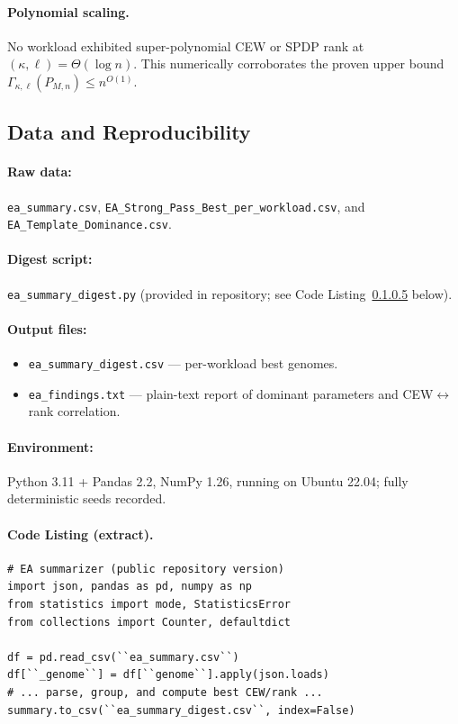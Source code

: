 \documentclass[12pt]{article}
\theoremstyle{definition}
\theoremstyle{definition}
\theoremstyle{remark}
\theoremstyle{remark}
\begin{document}
\paragraph{Polynomial scaling.}
No workload exhibited super-polynomial CEW or SPDP rank at $(\kappa, \ell) = \Theta(\log n)$. This numerically corroborates the proven upper bound $\Gamma_{\kappa,\ell}(P_{M,n}) \leq n^{O(1)}$.

\subsection{Data and Reproducibility}

\paragraph{Raw data:}
\texttt{ea\_summary.csv}, \texttt{EA\_Strong\_Pass\_Best\_per\_workload.csv}, and \texttt{EA\_Template\_Dominance.csv}.

\paragraph{Digest script:}
\texttt{ea\_summary\_digest.py} (provided in repository; see Code Listing~\ref{code:ea-digest} below).

\paragraph{Output files:}
\begin{itemize}
\item \texttt{ea\_summary\_digest.csv} --- per-workload best genomes.
\item \texttt{ea\_findings.txt} --- plain-text report of dominant parameters and CEW$\leftrightarrow$rank correlation.
\end{itemize}

\paragraph{Environment:}
Python 3.11 + Pandas 2.2, NumPy 1.26, running on Ubuntu 22.04; fully deterministic seeds recorded.

\paragraph{Code Listing (extract).}
\label{code:ea-digest}
\begin{verbatim}
# EA summarizer (public repository version)
import json, pandas as pd, numpy as np
from statistics import mode, StatisticsError
from collections import Counter, defaultdict

df = pd.read_csv(``ea_summary.csv``)
df[``_genome``] = df[``genome``].apply(json.loads)
# ... parse, group, and compute best CEW/rank ...
summary.to_csv(``ea_summary_digest.csv``, index=False)
\end{verbatim}
\end{document}
